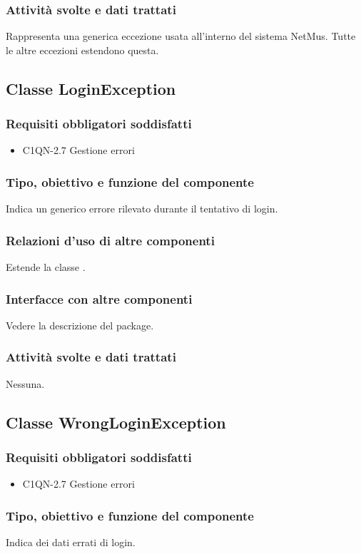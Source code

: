 \subsubsection*{Attivit\`a svolte e dati trattati}
Rappresenta una generica eccezione usata all'interno del sistema NetMus. Tutte
le altre eccezioni estendono questa.

\subsection{Classe LoginException}
\subsubsection*{Requisiti obbligatori soddisfatti}
\begin{itemize}
	\item C1QN-2.7 Gestione errori
\end{itemize}
\subsubsection*{Tipo, obiettivo e funzione del componente}
Indica un generico errore rilevato durante il tentativo di login.
\subsubsection*{Relazioni d'uso di altre componenti}
Estende la classe .
\subsubsection*{Interfacce con altre componenti}
Vedere la descrizione del package.
\subsubsection*{Attivit\`a svolte e dati trattati}
Nessuna.

\subsection{Classe WrongLoginException}
\subsubsection*{Requisiti obbligatori soddisfatti}
\begin{itemize}
	\item C1QN-2.7 Gestione errori
\end{itemize}
\subsubsection*{Tipo, obiettivo e funzione del componente}
Indica dei dati errati di login.
